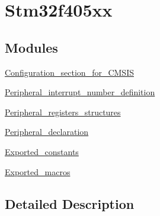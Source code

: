 \hypertarget{group__stm32f405xx}{}\section{Stm32f405xx}
\label{group__stm32f405xx}
\subsection*{Modules}
\begin{DoxyCompactItemize}
\item 
\hyperlink{group___configuration__section__for___c_m_s_i_s}{Configuration\+\_\+section\+\_\+for\+\_\+\+C\+M\+S\+IS}
\item 
\hyperlink{group___peripheral__interrupt__number__definition}{Peripheral\+\_\+interrupt\+\_\+number\+\_\+definition}
\item 
\hyperlink{group___peripheral__registers__structures}{Peripheral\+\_\+registers\+\_\+structures}
\item 
\hyperlink{group___peripheral__declaration}{Peripheral\+\_\+declaration}
\item 
\hyperlink{group___exported__constants}{Exported\+\_\+constants}
\item 
\hyperlink{group___exported__macros}{Exported\+\_\+macros}
\end{DoxyCompactItemize}


\subsection{Detailed Description}
